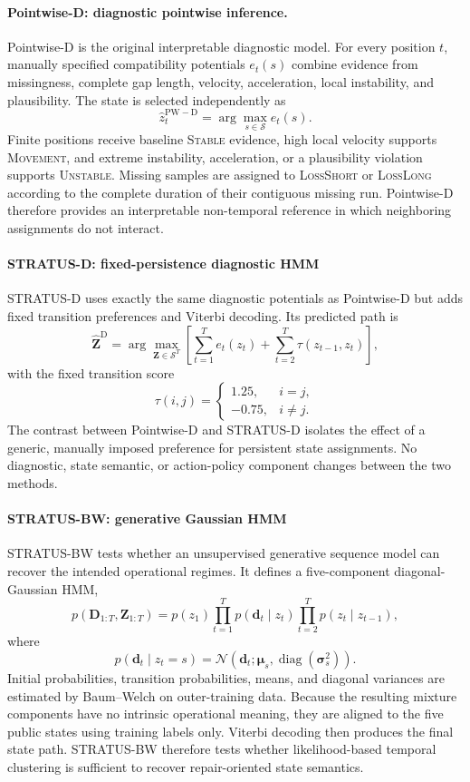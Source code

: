 \documentclass[sigconf,review]{acmart}
\begin{document}
\paragraph{Pointwise-D: diagnostic pointwise inference.}
Pointwise-D is the original interpretable diagnostic model. For every
position $t$, manually specified compatibility potentials
$e_t(s)$ combine evidence from missingness, complete gap length,
velocity, acceleration, local instability, and plausibility. The state is
selected independently as
\[
\hat{z}_t^{\mathrm{PW-D}}
=
\arg\max_{s\in\mathcal{S}} e_t(s).
\]
Finite positions receive baseline \textsc{Stable} evidence, high local
velocity supports \textsc{Movement}, and extreme instability,
acceleration, or a plausibility violation supports \textsc{Unstable}.
Missing samples are assigned to \textsc{LossShort} or
\textsc{LossLong} according to the complete duration of their contiguous
missing run. Pointwise-D therefore provides an interpretable
non-temporal reference in which neighboring assignments do not interact.

\paragraph{STRATUS-D: fixed-persistence diagnostic HMM}
STRATUS-D uses exactly the same diagnostic potentials as Pointwise-D but
adds fixed transition preferences and Viterbi decoding. Its predicted path
is
\[
\hat{\mathbf{Z}}^{\mathrm{D}}
=
\arg\max_{\mathbf{Z}\in\mathcal{S}^{T}}
\left[
\sum_{t=1}^{T} e_t(z_t)
+
\sum_{t=2}^{T} \tau(z_{t-1},z_t)
\right],
\]
with the fixed transition score
\[
\tau(i,j)
=
\begin{cases}
1.25, & i=j,\\
-0.75, & i\neq j.
\end{cases}
\]
The contrast between Pointwise-D and STRATUS-D isolates the effect of a
generic, manually imposed preference for persistent state assignments.
No diagnostic, state semantic, or action-policy component changes between
the two methods.

\paragraph{STRATUS-BW: generative Gaussian HMM}
STRATUS-BW tests whether an unsupervised generative sequence model can
recover the intended operational regimes. It defines a five-component
diagonal-Gaussian HMM,
\[
p(\mathbf{D}_{1:T},\mathbf{Z}_{1:T})
=
p(z_1)
\prod_{t=1}^{T} p(\mathbf{d}_t\mid z_t)
\prod_{t=2}^{T} p(z_t\mid z_{t-1}),
\]
where
\[
p(\mathbf{d}_t\mid z_t=s)
=
\mathcal{N}
\!\left(
\mathbf{d}_t;
\boldsymbol{\mu}_s,
\operatorname{diag}(\boldsymbol{\sigma}_s^2)
\right).
\]
Initial probabilities, transition probabilities, means, and diagonal
variances are estimated by Baum--Welch on outer-training data. Because
the resulting mixture components have no intrinsic operational meaning,
they are aligned to the five public states using training labels only.
Viterbi decoding then produces the final state path. STRATUS-BW therefore
tests whether likelihood-based temporal clustering is sufficient to
recover repair-oriented state semantics.
\end{document}
